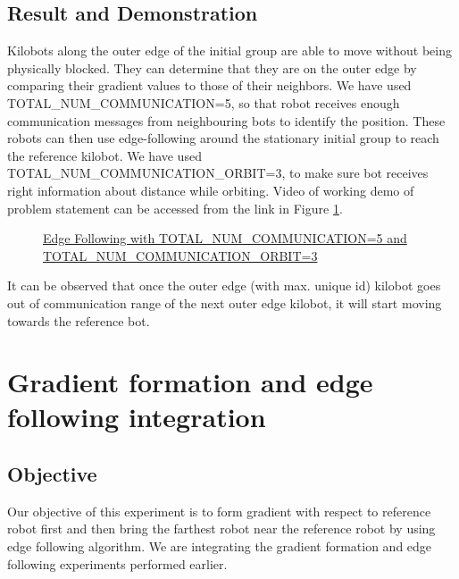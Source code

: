 \documentclass{report}[12pt]
\begin{document}
\section{Result and Demonstration}
Kilobots along the outer edge of the initial group are able to move without being physically blocked. They can determine that they are on the outer edge by comparing their gradient values to those of their neighbors. We have used TOTAL\_NUM\_COMMUNICATION=5, so that robot receives enough communication messages from neighbouring bots to identify the position. These robots can then use edge-following around the stationary initial group to reach the reference kilobot. We have used TOTAL\_NUM\_COMMUNICATION\_ORBIT=3, to make sure bot receives right information about distance while orbiting.
Video of working demo of problem statement can be accessed from the link in Figure \ref{fig:Edge Following}.

\begin{figure}[H]
	\centering
	\caption{\href{https://drive.google.com/file/d/13Svhl9CzhrJuGXXccM-IlZTrmvq1gzwJ/view}{Edge Following with TOTAL\_NUM\_COMMUNICATION=5 and TOTAL\_NUM\_COMMUNICATION\_ORBIT=3}}
	\label{fig:Edge Following}
\end{figure}

It can be observed that once the outer edge (with max. unique id) kilobot goes out of communication range of the next outer edge kilobot, it will start moving towards the reference bot.

\chapter{Gradient formation and edge following integration}

\section{Objective}
Our objective of this experiment is to form gradient with respect to reference robot first and then bring the farthest robot near the reference robot by using edge following algorithm. We are integrating the gradient formation and edge following experiments performed earlier.
\end{document}
